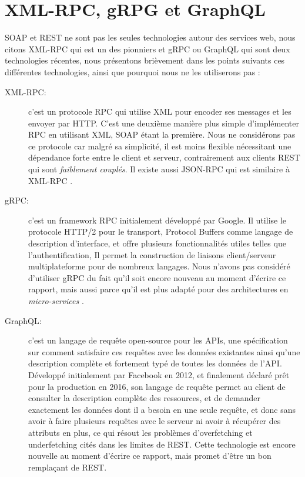 \section{XML-RPC, gRPG et GraphQL}
SOAP et REST ne sont pas les seules technologies autour des services web, nous citons XML-RPC qui est un des pionniers et gRPC ou GraphQL qui sont deux technologies récentes, nous présentons brièvement dans les points suivants ces différentes technologies, ainsi que pourquoi nous ne les utiliserons pas :
\begin{description}
\item[XML-RPC:] c'est un protocole RPC
qui utilise XML pour encoder ses messages et les envoyer par HTTP.
C'est une deuxième manière plus simple d'implémenter RPC en utilisant XML, SOAP étant la première. Nous ne considérons pas ce protocole car malgré sa simplicité, il est moins flexible nécessitant une dépendance forte entre le client et serveur, contrairement aux clients REST qui sont \emph{faiblement couplés}.
Il existe aussi JSON-RPC qui est similaire à XML-RPC \cite{XMLRPC}.

\item[gRPC: ] c'est un framework RPC initialement développé par Google. Il utilise le protocole HTTP/2 pour le transport, Protocol Buffers comme langage de description d'interface, et offre plusieurs fonctionnalités utiles telles que l'authentification, Il permet la construction de liaisons client/serveur multiplateforme pour de nombreux langages.
Nous n'avons pas considéré d'utiliser gRPC du fait qu'il soit encore nouveau au moment d'écrire ce rapport, mais aussi parce qu'il est plus adapté pour des architectures en \emph{micro-services} \cite{gRPC}.

\item[GraphQL:] c'est un langage de requête open-source pour les APIs, une spécification sur comment satisfaire ces requêtes avec les données existantes ainsi qu'une description complète et fortement typé de toutes les données de l'API.
Développé initialement par Facebook en 2012, et finalement déclaré prêt pour la production en 2016, son langage de requête permet au client de consulter la description complète des ressources, et de demander exactement les données dont il a besoin en une seule requête, et donc sans avoir à faire plusieurs requêtes avec le serveur ni avoir à récupérer des attributs en plus, ce qui résout les problèmes d'overfetching et underfetching cités dans les limites de REST.
Cette technologie est encore nouvelle au moment d'écrire ce rapport, mais promet d'être un bon remplaçant de REST.


\end{description}
